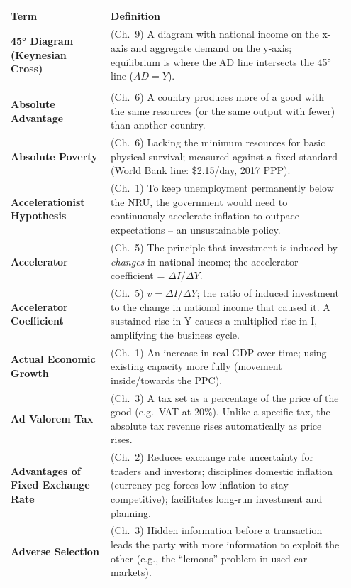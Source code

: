 \documentclass[11pt, a4paper, twoside]{book}
\begin{document}
\begin{longtable}{@{}>{\RaggedRight\arraybackslash}p{0.28\linewidth}>{\RaggedRight\arraybackslash}p{0.67\linewidth}@{}}
\textbf{\color{CurveNavy}Term} & \textbf{\color{CurveNavy}Definition} \\
\midrule
\endhead

\textbf{45° Diagram (Keynesian Cross)} & (Ch.~9) A diagram with national income on the x-axis and aggregate demand on the y-axis; equilibrium is where the AD line intersects the 45° line ($AD = Y$). \\

\multicolumn{2}{@{}l}{\textbf{\Large\color{CurveNavy} A}} \\[2pt]
\textbf{Absolute Advantage} & (Ch.~6) A country produces more of a good with the same resources (or the same output with fewer) than another country. \\
\textbf{Absolute Poverty} & (Ch.~6) Lacking the minimum resources for basic physical survival; measured against a fixed standard (World Bank line: \$2.15/day, 2017 PPP). \\
\textbf{Accelerationist Hypothesis} & (Ch.~1) To keep unemployment permanently below the NRU, the government would need to continuously accelerate inflation to outpace expectations -- an unsustainable policy. \\
\textbf{Accelerator} & (Ch.~5) The principle that investment is induced by \emph{changes} in national income; the accelerator coefficient = $\Delta I / \Delta Y$. \\
\textbf{Accelerator Coefficient} & (Ch.~5) $v = \Delta I / \Delta Y$; the ratio of induced investment to the change in national income that caused it. A sustained rise in Y causes a multiplied rise in I, amplifying the business cycle. \\
\textbf{Actual Economic Growth} & (Ch.~1) An increase in real GDP over time; using existing capacity more fully (movement inside/towards the PPC). \\
\textbf{Ad Valorem Tax} & (Ch.~3) A tax set as a percentage of the price of the good (e.g.\ VAT at 20\%). Unlike a specific tax, the absolute tax revenue rises automatically as price rises. \\
\textbf{Advantages of Fixed Exchange Rate} & (Ch.~2) Reduces exchange rate uncertainty for traders and investors; disciplines domestic inflation (currency peg forces low inflation to stay competitive); facilitates long-run investment and planning. \\
\textbf{Adverse Selection} & (Ch.~3) Hidden information before a transaction leads the party with more information to exploit the other (e.g., the ``lemons'' problem in used car markets). \\

\end{longtable}
\end{document}
